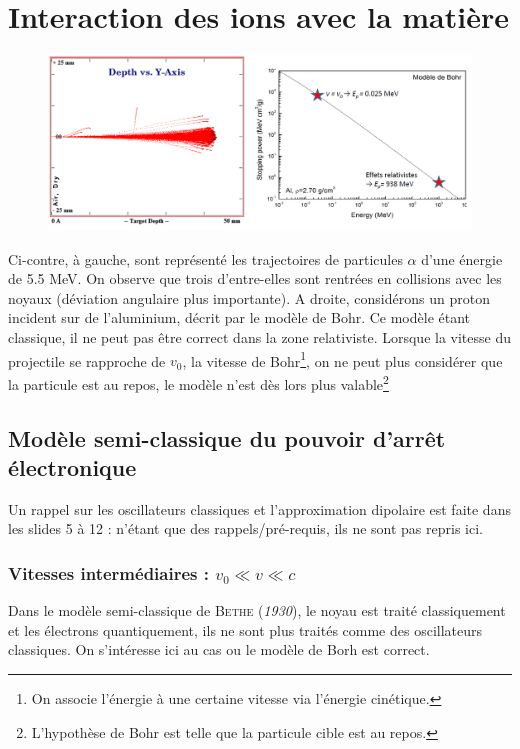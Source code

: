 \chapter{Interaction des ions avec la matière}
	\begin{figure}
	\vspace{-5mm}
	\includegraphics[scale=0.3]{ch2/image1.png}
	\end{figure}
Ci-contre, à gauche, sont représenté les trajectoires de particules $\alpha$ d'une énergie
de 5.5 MeV. On observe que trois d'entre-elles sont rentrées en collisions avec les noyaux
(déviation angulaire plus importante). A droite, considérons un proton incident sur 
de l'aluminium, décrit par le modèle de Bohr. Ce modèle étant classique, il ne peut pas être
correct dans la zone relativiste. Lorsque la vitesse du projectile se rapproche de $v_0$, 
la vitesse de Bohr\footnote{On associe l'énergie à une certaine vitesse via l'énergie cinétique.}, 
on ne peut plus considérer que la particule est au repos, le modèle n'est dès lors plus 
valable\footnote{L'hypothèse de Bohr est telle que la particule cible est au repos.}

\section{Modèle semi-classique du pouvoir d'arrêt électronique}
Un rappel sur les oscillateurs classiques et l'approximation dipolaire est faite dans les
slides 5 à 12 : n'étant que des rappels/pré-requis, ils ne sont pas repris ici.

\subsection{Vitesses intermédiaires : $v_0\ll v \ll c$}
Dans le modèle semi-classique de \textsc{Bethe} (\textit{1930}), le noyau est traité 
classiquement et les électrons quantiquement, ils ne sont plus traités comme des oscillateurs
classiques. On s'intéresse ici au cas ou le modèle de Borh est correct. \\

